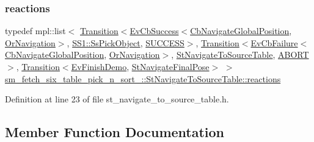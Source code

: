 \subsubsection{\texorpdfstring{reactions}{reactions}}
{\footnotesize\ttfamily typedef mpl\+::list$<$ \hyperlink{classsmacc_1_1Transition}{Transition}$<$\hyperlink{structsmacc_1_1EvCbSuccess}{Ev\+Cb\+Success}$<$\hyperlink{classcl__move__base__z_1_1CbNavigateGlobalPosition}{Cb\+Navigate\+Global\+Position}, \hyperlink{classsm__fetch__six__table__pick__n__sort__1_1_1OrNavigation}{Or\+Navigation}$>$, \hyperlink{structsm__fetch__six__table__pick__n__sort__1_1_1SS1_1_1SsPickObject}{S\+S1\+::\+Ss\+Pick\+Object}, \hyperlink{structsmacc_1_1default__transition__tags_1_1SUCCESS}{S\+U\+C\+C\+E\+SS}$>$, \hyperlink{classsmacc_1_1Transition}{Transition}$<$\hyperlink{structsmacc_1_1EvCbFailure}{Ev\+Cb\+Failure}$<$\hyperlink{classcl__move__base__z_1_1CbNavigateGlobalPosition}{Cb\+Navigate\+Global\+Position}, \hyperlink{classsm__fetch__six__table__pick__n__sort__1_1_1OrNavigation}{Or\+Navigation}$>$, \hyperlink{structsm__fetch__six__table__pick__n__sort__1_1_1StNavigateToSourceTable}{St\+Navigate\+To\+Source\+Table}, \hyperlink{structsmacc_1_1default__transition__tags_1_1ABORT}{A\+B\+O\+RT}$>$, \hyperlink{classsmacc_1_1Transition}{Transition}$<$\hyperlink{structsm__fetch__six__table__pick__n__sort__1_1_1EvFinishDemo}{Ev\+Finish\+Demo}, \hyperlink{structsm__fetch__six__table__pick__n__sort__1_1_1StNavigateFinalPose}{St\+Navigate\+Final\+Pose}$>$ $>$ \hyperlink{structsm__fetch__six__table__pick__n__sort__1_1_1StNavigateToSourceTable_a491e024c3ceebcf81d035323b1edc32b}{sm\+\_\+fetch\+\_\+six\+\_\+table\+\_\+pick\+\_\+n\+\_\+sort\+\_\+::\+St\+Navigate\+To\+Source\+Table\+::reactions}}



Definition at line 23 of file st\+\_\+navigate\+\_\+to\+\_\+source\+\_\+table.\+h.



\subsection{Member Function Documentation}
\mbox{\label{structsm__fetch__six__table__pick__n__sort__1_1_1StNavigateToSourceTable_aff505f7bdc92511e1fce3c703c7165a4}} 
